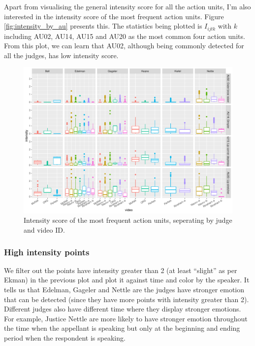 \documentclass{monashthesis}
\begin{document}
Apart from visualising the general intensity score for all the action units, I'm also interested in the intensity score of the most frequent action units. Figure \ref{fig:intensity_by_au} presents this. The statistics being plotted is \(I_{ijtk}\) with \(k\) including AU02, AU14, AU15 and AU20 as the most common four action units. From this plot, we can learn that AU02, although being commonly detected for all the judges, has low intensity score.

\begin{figure}

{\centering \includegraphics[width=1\linewidth]{figures/intensity-most-frequent-1} 

}

\caption{Intensity score of the most frequent action units, seperating by judge and video ID.\label{fig:intensity_by_au}}\label{fig:intensity-most-frequent}
\end{figure}

\hypertarget{high-intensity-points}{%
\subsubsection{High intensity points}\label{high-intensity-points}}

We filter out the points have intensity greater than 2 (at least ``slight'' as per Ekman) in the previous plot and plot it against time and color by the speaker. It tells us that Edelman, Gageler and Nettle are the judges have stronger emotion that can be detected (since they have more points with intensity greater than 2). Different judges also have different time where they display stronger emotions. For example, Justice Nettle are more likely to have stronger emotion throughout the time when the appellant is speaking but only at the beginning and ending period when the respondent is speaking.
\end{document}
